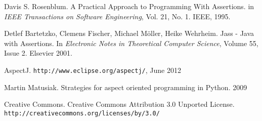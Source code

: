 \documentclass[a4paper,11pt]{article}
\begin{document}
\begin{thebibliography}{99}
	Davis S. Rosenblum.
	A Practical Approach to Programming With Assertions.
	in \emph{IEEE Transactions on Software Engineering}, Vol. 21, No. 1.
	IEEE, 1995.

	Detlef Bartetzko, Clemens Fischer, Michael Möller, Heike Wehrheim.
	Jass - Java with Assertions.
	In \emph{Electronic Notes in Theoretical Computer Science}, Volume 55, Issue 2.
	Elsevier 2001.

	AspectJ.
	\texttt{http://www.eclipse.org/aspectj/},
	June 2012

	Martin Matusiak.
	Strategies for aspect oriented programming in Python.
	2009

	Creative Commons.
	Creative Commons Attribution 3.0 Unported License.
	\texttt{http://creativecommons.org/licenses/by/3.0/}

\end{thebibliography}
\end{document}
